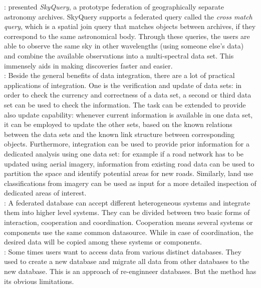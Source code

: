 \documentclass[12pt,a4paper]{report}
\newcommand{\term}{\textit}
\begin{document}
	\citet{Malik}: presented \term{SkyQuery}, a prototype federation of geographically separate astronomy archives. SkyQuery supports a federated query called the \term{cross match query}, which is a spatial join query that matches objects between archives, if they correspond to the same astronomical body. Through these queries, the users are able to observe the same sky in other wavelengths (using someone else’s data) and combine the available observations into a multi-spectral data set. This immensely aids in making discoveries faster and easier.
	\\

	\citep{Butenuth}: Beside the general benefits of data integration, there are a lot of practical applications of integration. One is the verification and update of data sets: in order to check the currency and correctness of a data set, a second or third data set can be used to check the information. The task can be extended to provide also update capability: whenever current information is available in one data set, it can be employed to update the other sets, based on the known relations between the data sets and the known link structure between corresponding objects. Furthermore, integration can be used to provide prior information for a dedicated analysis using one data set: for example if a road network has to be updated using aerial imagery, information from existing road data can be used to partition the space and identify potential areas for new roads. Similarly, land use classifications from imagery can be used as input for a more detailed inspection of dedicated areas of interest. 
	\\

	\citep{Jian}: A federated database can accept different heterogeneous systems and integrate them into higher level systems. They can be divided between two basic forms of interaction, cooperation and coordination. Cooperation means several systems or components use the same common datasource. While in case of coordination, the desired data will be copied among these systems or components.
	\\

	\citep{Jian}: Some times users want to access data from various distinct databases. They used to create a new database and migrate all data from other databases to the new database. This is an approach of re-enginneer databases. But the method has its obvious limitations.
	\\
\end{document}
